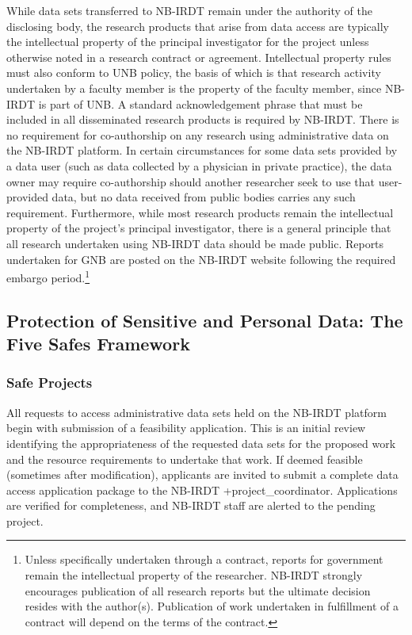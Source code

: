 \documentclass[
]{WileySix}
\begin{document}
While data sets transferred to NB-IRDT remain under the authority of the disclosing body, the research products that arise from data access are typically the intellectual property of the principal investigator for the project unless otherwise noted in a research contract or agreement. Intellectual property rules must also conform to UNB policy, the basis of which is that research activity undertaken by a faculty member is the property of the faculty member, since NB-IRDT is part of UNB. A standard acknowledgement phrase that must be included in all disseminated research products is required by NB-IRDT. There is no requirement for co-authorship on any research using administrative data on the NB-IRDT platform. In certain circumstances for some data sets provided by a data user (such as data collected by a physician in private practice), the data owner may require co-authorship should another researcher seek to use that user-provided data, but no data received from public bodies carries any such requirement. Furthermore, while most research products remain the intellectual property of the project's principal investigator, there is a general principle that all research undertaken using NB-IRDT data should be made public. Reports undertaken for GNB are posted on the NB-IRDT website following the required embargo period.\footnote{Unless specifically undertaken through a contract, reports for government remain the intellectual property of the researcher. NB-IRDT strongly encourages publication of all research reports but the ultimate decision resides with the author(s). Publication of work undertaken in fulfillment of a contract will depend on the terms of the contract.}

\hypertarget{protection-of-sensitive-and-personal-data-the-five-safes-framework-2}{%
\subsection{Protection of Sensitive and Personal Data: The Five Safes Framework}\label{protection-of-sensitive-and-personal-data-the-five-safes-framework-2}}

\hypertarget{safe-projects-2}{%
\subsubsection{Safe Projects}\label{safe-projects-2}}

All requests to access administrative data sets held on the NB-IRDT platform begin with submission of a feasibility application. This is an initial review identifying the appropriateness of the requested data sets for the proposed work and the resource requirements to undertake that work. If deemed feasible (sometimes after modification), applicants are invited to submit a complete data access application package to the NB-IRDT +project\_coordinator\textbar. Applications are verified for completeness, and NB-IRDT staff are alerted to the pending project.
\end{document}
